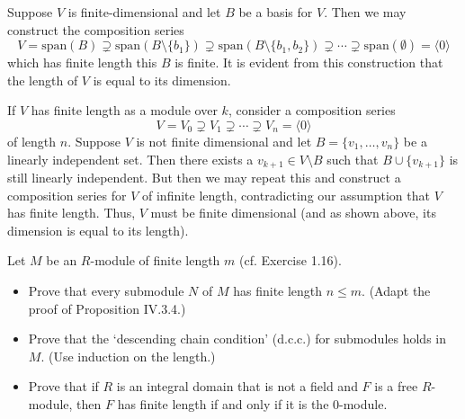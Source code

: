 \documentclass[../../master.tex]{subfiles}
\begin{document}
\begin{solution}
    Suppose $V$ is finite-dimensional and let $B$ be a basis for $V$.
    Then we may construct the composition series
    \[
        V = \text{span}(B) \supsetneq \text{span}(B \setminus \{b_1\}) \supsetneq \text{span}(B \setminus \{b_1, b_2\}) \supsetneq \cdots \supsetneq \text{span}(\emptyset) = \langle 0 \rangle
    \]
    which has finite length this $B$ is finite.
    It is evident from this construction that the length of $V$ is equal to its dimension.

    If $V$ has finite length as a module over $k$, consider a composition series
    \[
        V = V_0 \supsetneq V_1 \supsetneq \cdots \supsetneq V_n = \langle 0 \rangle
    \]
    of length $n$.
    Suppose $V$ is not finite dimensional and let $B = \{v_1, \ldots, v_n\}$ be a linearly independent set.
    Then there exists a $v_{k+1} \in V \setminus B$ such that $B \cup \{v_{k+1}\}$ is still linearly independent.
    But then we may repeat this and construct a composition series for $V$ of infinite length, contradicting our assumption that $V$ has finite length.
    Thus, $V$ must be finite dimensional (and as shown above, its dimension is equal to its length).
\end{solution}

\begin{problem}
    Let $M$ be an $R$-module of finite length $m$ (cf. Exercise 1.16).
    \begin{itemize}
        \item Prove that every submodule $N$ of $M$ has finite length $n \leq m$.
            (Adapt the proof of Proposition IV.3.4.)
        \item Prove that the `descending chain condition' (d.c.c.) for submodules holds in $M$.
            (Use induction on the length.)
        \item Prove that if $R$ is an integral domain that is not a field and $F$ is a free $R$-module, then $F$ has finite length if and only if it is the 0-module.
    \end{itemize}
\end{problem}
\end{document}
